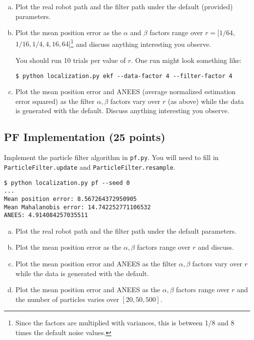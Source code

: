 \documentclass{article}
\newcommand{\?}{\stackrel{?}{=}}
\begin{document}
\begin{enumerate}[(a)]
\item Plot the real robot path and the filter path under the default (provided)
  parameters.
\item Plot the mean position error as the $\alpha$ and $\beta$ factors
  range over $r = [1/64,$ $1/16, 1/4, 4, 16, 64]$\footnote{
  Since the factors are multiplied with variances, this is between 1/8 and 8 times the default noise values.}
  and discuss anything interesting you observe.

  You should run 10 trials per value of $r$. One run might look something like:
\begin{verbatim}$ python localization.py ekf --data-factor 4 --filter-factor 4\end{verbatim}
\item Plot the mean position error and ANEES (average normalized estimation error squared)
  as the filter $\alpha, \beta$ factors vary over $r$ (as above) while the data is generated with the
  default. Discuss anything interesting you observe.
\end{enumerate}

\subsection{PF Implementation (25 points)}

Implement the particle filter algorithm in \texttt{pf.py}.
You will need to fill in \verb|ParticleFilter.update| and \verb|ParticleFilter.resample|.
\begin{verbatim}
$ python localization.py pf --seed 0
...
Mean position error: 8.567264372950905
Mean Mahalanobis error: 14.742252771106532
ANEES: 4.914084257035511
\end{verbatim}

\begin{enumerate}[(a)]
\item Plot the real robot path and the filter path under the default
  parameters.
\item Plot the mean position error as the $\alpha, \beta$ factors
  range over $r$ and discuss.
\item Plot the mean position error and ANEES as the filter $\alpha, \beta$ factors
  vary over $r$ while the data is generated with the default.
\item Plot the mean position error and ANEES as the $\alpha, \beta$ factors
  range over $r$ and the number of particles varies over $[20, 50, 500]$.
\end{enumerate}
\end{document}
